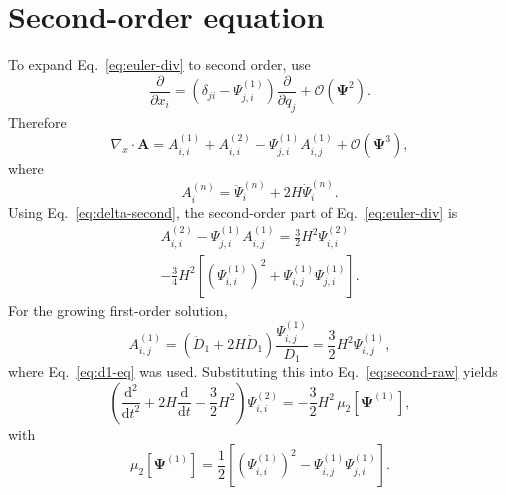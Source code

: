 \documentclass[11pt]{article}
\newcommand{\dd}{\mathrm{d}}
\newcommand{\gradx}{\nabla_{\!x}}
\newcommand{\PsiL}{\bm{\Psi}}
\begin{document}
\section{Second-order equation}

To expand Eq.~\eqref{eq:euler-div} to second order, use
\begin{equation}
  \frac{\partial}{\partial x_i}
  =
  \left(\delta_{ji}-\Psi^{(1)}_{j,i}\right)
  \frac{\partial}{\partial q_j}
  +\mathcal{O}(\PsiL^2).
\end{equation}
Therefore
\begin{equation}
  \gradx\cdot\bm{A}
  =
  A^{(1)}_{i,i}
  +A^{(2)}_{i,i}
  -\Psi^{(1)}_{j,i}A^{(1)}_{i,j}
  +\mathcal{O}(\PsiL^3),
  \label{eq:lhs-second}
\end{equation}
where
\begin{equation}
  A^{(n)}_i
  =
  \ddot\Psi^{(n)}_i+2H\dot\Psi^{(n)}_i .
\end{equation}
Using Eq.~\eqref{eq:delta-second}, the second-order part of
Eq.~\eqref{eq:euler-div} is
\begin{multline}
  A^{(2)}_{i,i}-\Psi^{(1)}_{j,i}A^{(1)}_{i,j}
  =
  \frac{3}{2}H^2\Psi^{(2)}_{i,i} \\
  -\frac{3}{4}H^2
  \left[
      \left(\Psi^{(1)}_{i,i}\right)^2
      +\Psi^{(1)}_{i,j}\Psi^{(1)}_{j,i}
  \right].
  \label{eq:second-raw}
\end{multline}
For the growing first-order solution,
\begin{equation}
  A^{(1)}_{i,j}
  =
  \left(\ddot D_1+2H\dot D_1\right)
  \frac{\Psi^{(1)}_{i,j}}{D_1}
  =
  \frac{3}{2}H^2\Psi^{(1)}_{i,j},
\end{equation}
where Eq.~\eqref{eq:d1-eq} was used.  Substituting this into
Eq.~\eqref{eq:second-raw} yields
\begin{equation}
  \left(
    \frac{\dd^2}{\dd t^2}
    +2H\frac{\dd}{\dd t}
    -\frac{3}{2}H^2
  \right)
  \Psi^{(2)}_{i,i}
  =
  -\frac{3}{2}H^2\,
  \mu_2\!\left[\PsiL^{(1)}\right],
  \label{eq:second-div-eq}
\end{equation}
with
\begin{equation}
  \mu_2\!\left[\PsiL^{(1)}\right]
  =
  \frac{1}{2}
  \left[
    \left(\Psi^{(1)}_{i,i}\right)^2
    -\Psi^{(1)}_{i,j}\Psi^{(1)}_{j,i}
  \right].
  \label{eq:mu2-first}
\end{equation}
\end{document}
